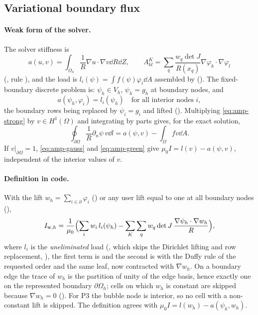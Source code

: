 \subsection{Variational boundary flux}\label{sec:amp-weak}
\paragraph{Weak form of the solver.} The solver stiffness is
\begin{equation}
a(u,v)=\int_{\Omega_h}\frac{1}{R}\nabla u\cdot\nabla v\dd R\dd Z,
\qquad A^{K}_{kl}=\sum_q \frac{w_q\det J}{R(x_q)}\nabla\varphi_k\cdot\nabla\varphi_l
\label{eq:amp-a}
\end{equation}
(, rule ), and the
load is $l_i(\psi)=\int f(\psi)\varphi_i\dd A$ assembled by
 (). The fixed-boundary
discrete problem is: $\psi_h\in V_h$, $\psi_h=g_h$ at boundary nodes, and
\begin{equation}
a(\psi_h,\varphi_i)=l_i(\psi_h)\quad\text{for all interior nodes } i,
\label{eq:amp-galerkin}
\end{equation}
the boundary rows being replaced by $\psi_i=g_i$ and lifted
(). Multiplying \eqref{eq:amp-strong} by
$v\in H^1(\Omega)$ and integrating by parts gives, for the exact solution,
\begin{equation}
\oint_{\partial\Omega}\frac{1}{R}\partial_n\psi\,v\dd l=a(\psi,v)-\int_\Omega fv\dd A .
\label{eq:amp-green}
\end{equation}
If $v|_{\partial\Omega}=1$, \eqref{eq:amp-gauss} and \eqref{eq:amp-green} give
$\mu_0I=l(v)-a(\psi,v)$, independent of the interior values of $v$.

\paragraph{Definition in code.} With the lift $w_h=\sum_{i\in\partial}\varphi_i$
() or any user lift equal to one at all
boundary nodes (),
\begin{equation}
I_{\mathrm w,h}=\frac{1}{\mu_0}\Bigl(\sum_i w_i\,l_i(\psi_h)
-\sum_K\sum_q w_q\det J\,\frac{\nabla\psi_h\cdot\nabla w_h}{R}\Bigr),
\label{eq:amp-weak}
\end{equation}
where $l_i$ is the \emph{uneliminated} load (,
which skips the Dirichlet lifting and row replacement,
), the first term is
 and the second is
 with the Duffy rule of the requested order
and the same  leaf, now contracted with $\nabla w_h$.
On a boundary edge the trace of $w_h$ is the partition of unity of the edge
basis, hence exactly one on the represented boundary $\partial\Omega_h$; cells
on which $w_h$ is constant are skipped because $\nabla w_h=0$
(). For P3 the bubble node is interior, so no
cell with a non-constant lift is skipped. The definition agrees with
$\mu_0I=l(w_h)-a(\psi_h,w_h)$.

